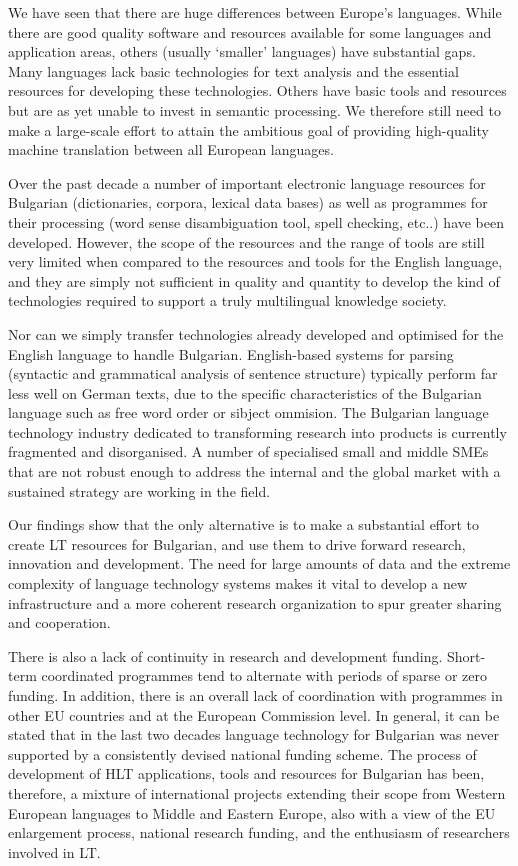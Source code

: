 \begin{multicols}{2}
We have seen that there are huge differences between Europe’s
languages. While there are good quality software and resources
available for some languages and application areas, others (usually
‘smaller’ languages) have substantial gaps.  Many languages lack basic
technologies for text analysis and the essential resources for
developing these technologies. Others have basic tools and resources
but are as yet unable to invest in semantic processing. We therefore
still need to make a large-scale effort to attain the ambitious goal
of providing high-quality machine translation between all European
languages.

Over the past decade a number of important electronic language resources for Bulgarian (dictionaries, corpora, lexical data bases) as well as programmes for their processing (word sense disambiguation tool, spell checking, etc..) have been developed. However, the scope of the resources and the range of tools are still very limited when compared to the resources and tools for the English language, and they are simply not sufficient in quality and quantity to develop the kind of technologies required to support a truly multilingual knowledge society.

Nor can we simply transfer technologies already developed and optimised for the English language to handle Bulgarian. English-based systems for parsing (syntactic and grammatical analysis of sentence structure) typically perform far less well on German texts, due to the specific characteristics of the Bulgarian language such as free word order or sibject ommision.
The Bulgarian language technology industry dedicated to transforming research into products is currently fragmented and disorganised. A number of specialised small and middle SMEs that are not robust enough to address the internal and the global market with a sustained strategy are working in the field.

  Our findings show that the only alternative is to make a substantial effort to create LT resources for Bulgarian, and use them to drive forward research, innovation and development. The need for large amounts of data and the extreme complexity of language technology systems makes it vital to develop a new infrastructure and a more coherent research organization to spur greater sharing and cooperation.

There is also a lack of continuity in research and development funding. Short-term coordinated programmes tend to alternate with periods of sparse or zero funding. In addition, there is an overall lack of coordination with programmes in other EU countries and at the European Commission level.
In general, it can be stated that in the last two decades language technology for Bulgarian was never supported by a consistently devised national funding scheme. The process of development of HLT applications, tools and resources for Bulgarian has been, therefore, a mixture of international projects extending their scope from Western European languages to Middle and Eastern Europe, also with a view of the EU enlargement process, national research funding, and the enthusiasm of researchers involved in LT.


\end{multicols}
